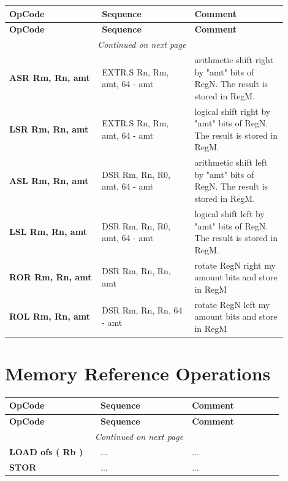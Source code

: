 \begin{longtable}{@{}p{0.3\linewidth}p{0.3\linewidth}p{0.3\linewidth}@{}}
    \toprule
    \textbf{OpCode} & \textbf{Sequence} & \textbf{Comment} \\
    \midrule
    \endfirsthead
    \toprule
    \textbf{OpCode} & \textbf{Sequence} & \textbf{Comment} \\
    \midrule
    \endhead
    \midrule
    \multicolumn{2}{r}{\textit{Continued on next page}} \\
    \midrule
    \endfoot
    \bottomrule
    \endlastfoot
    \textbf{ASR Rm, Rn, amt} & EXTR.S Rn, Rm, amt, 64 - amt & arithmetic shift right by "amt" bits of RegN. The result is stored in RegM. \\
    \midrule
    \textbf{LSR Rm, Rn, amt} & EXTR.S Rn, Rm, amt, 64 - amt & logical shift right by "amt" bits of RegN. The result is stored in RegM. \\
    \midrule
    \textbf{ASL Rm, Rn, amt} & DSR Rm, Rn, R0, amt, 64 - amt & arithmetic shift left by "amt" bits of RegN. The result is stored in RegM. \\
    \midrule
    \textbf{LSL Rm, Rn, amt} & DSR Rm, Rn, R0, amt, 64 - amt & logical shift left by "amt" bits of RegN. The result is stored in RegM. \\
    \midrule
    \textbf{ROR Rm, Rn, amt} & DSR Rm, Rn, Rn, amt & rotate RegN right my amount bits and store in RegM\\
    \midrule
    \textbf{ROL Rm, Rn, amt} & DSR Rm, Rn, Rn, 64 - amt & rotate RegN left my amount bits and store in RegM \\
    \midrule

\end{longtable}

\section*{Memory Reference Operations}

\begin{longtable}{@{}p{0.3\linewidth}p{0.3\linewidth}p{0.3\linewidth}@{}}
    \toprule
    \textbf{OpCode} & \textbf{Sequence} & \textbf{Comment} \\
    \midrule
    \endfirsthead
    \toprule
    \textbf{OpCode} & \textbf{Sequence} & \textbf{Comment} \\
    \midrule
    \endhead
    \midrule
    \multicolumn{2}{r}{\textit{Continued on next page}} \\
    \midrule
    \endfoot
    \bottomrule
    \endlastfoot
    \textbf{LOAD ofs ( Rb )} & ...  & ... \\
    \midrule
    \textbf{STOR} & ... & ... \\
    \midrule
\end{longtable}

